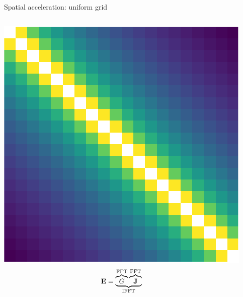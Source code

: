 \documentclass[aspectratio=169, usenames, dvipsnames]{beamer}
\begin{document}
\begin{frame}{Spatial acceleration: uniform grid}
\begin{columns}
      \begin{center}
        \includegraphics[height=0.4\textheight]{figures/grid_1d}
        \begin{equation*}
          \vb{E} = \underbrace{\overbrace{G}^\text{FFT} \overbrace{\vb{J}}^\text{FFT}}_\text{IFFT}
        \end{equation*}
      \end{center}
  \end{columns}
\end{frame}
\end{document}
